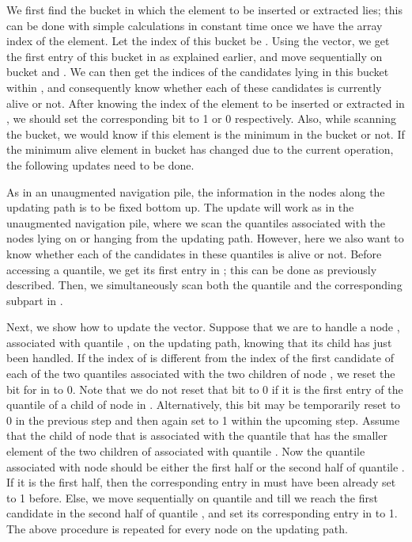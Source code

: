\documentclass[final,onetabnum,onefignum,onethmnum]{siamltex}
\begin{document}
We first find the bucket in which the element to be inserted or extracted
lies; this can be done with simple calculations in constant time once
we have the array index of the element. Let the index of this bucket
be . Using the  vector, we get the first entry of
this bucket in  as explained earlier, and move
sequentially on bucket  and . We can then get the
indices of the candidates lying in this bucket within
, and consequently know whether each of these
candidates is currently alive or not. After knowing the index of the
element to be inserted or extracted in , we should set
the corresponding bit to 1 or 0 respectively. Also, while scanning the bucket, we
would know if this element is the minimum in the bucket or not. If the
minimum alive element in bucket  has changed due to the current operation,
the following updates need to be done.

As in an unaugmented navigation pile, the information in the nodes along the updating path is to be fixed bottom up. 
The update will work as in the unaugmented navigation pile, where we scan the quantiles associated with the nodes lying on or hanging from the updating path. However, here we also want to know whether each of the candidates in these quantiles is alive or not.
Before accessing a quantile, we get its first entry in
; this can be done as previously described. 
Then, we simultaneously scan both the quantile and the corresponding subpart in .

Next, we show how to update the  vector.  Suppose that
we are to handle a node , associated with quantile , on the updating path, 
knowing that its child has just been handled.  If the index of 
 is different from the index of the first 
candidate of each of the two quantiles associated with the two children
of node , we reset the bit for  
in  to 0.  Note that we do not reset that bit
to 0 if it is the first entry of the quantile of a child of node 
in .  Alternatively, this bit may be temporarily reset
to 0 in the previous step and then again set to 1 within the upcoming
step.  Assume that the child of node  that is associated with the quantile
that has the smaller element of the two children of  associated with quantile
.  Now the quantile associated with node  should be either the
first half or the second half of quantile .  If it is the first
half, then the corresponding entry in  must have been
already set to 1 before.  Else, we move sequentially on quantile 
and  till we reach the first candidate in the second
half of quantile , and set its corresponding entry in  to 1. 
The above procedure is repeated for every node on the updating path.
\end{document}

